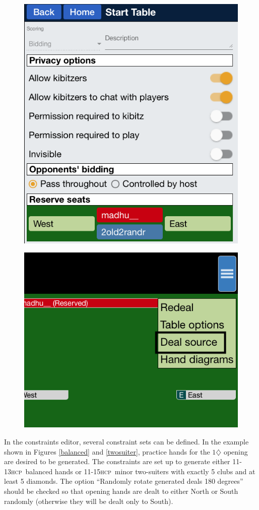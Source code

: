 \documentclass[a4paper,article,oneside]{memoir}
\newcommand{\hcp}{\textsc{hcp}}
\begin{document}
\begin{figure}[htbp]
  \centering
  \begin{minipage}{.6\textwidth}
    \centering
    \includegraphics[width=.6\linewidth]{start-table.png}
    \label{tablesetup}
  \end{minipage}%
  \begin{minipage}{.4\textwidth}
    \centering
    \includegraphics[width=.4\linewidth]{deal-setup.png}
    \label{dealmenu}
  \end{minipage}
\end{figure}

In the constraints editor, several constraint sets can be defined. In
the example shown in Figures \ref{balanced} and \ref{twosuiter},
practice hands for the $1\diamondsuit$ opening are desired to be
generated. The constraints are set up to generate either 11-13\hcp\
balanced hands or 11-15\hcp\ minor two-suiters with exactly 5 clubs
and at least 5 diamonds. The option ``Randomly rotate generated deals
180 degrees'' should be checked so that opening hands are dealt to
either North or South randomly (otherwise they will be dealt only to
South).
\end{document}
